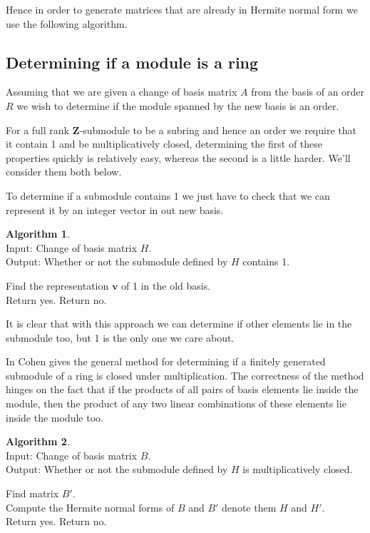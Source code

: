\documentclass[12pt,a4paper,abstracton,bibtotoc]{scrreprt}
\theoremstyle{definition}
\newtheorem{alg}{Algorithm}
\newcommand{\ZZ}{\mathbf{Z}}
\begin{document}
Hence in order to generate matrices that are already in Hermite normal form we use the following algorithm.

\subsection{Determining if a module is a ring}
Assuming that we are given a change of basis matrix $A$ from the basis of an order $R$ we wish to determine if the module spanned by the new basis is an order.

For a full rank $\ZZ$-submodule to be a subring and hence an order we require that it contain 1 and be multiplicatively closed, determining the first of these properties quickly is relatively easy, whereas the second is a little harder.
We'll consider them both below.

To determine if a submodule contains 1 we just have to check that we can represent it by an integer vector in out new basis.

\begin{alg}\label{alg:hasone}~\\ %
Input: Change of basis matrix $H$.\\
Output: Whether or not the submodule defined by $H$ contains 1.\\
\begin{algorithm}[H]
Find the representation $\mathbf v$ of 1 in the old basis.\\
{
Return yes.
}
{
Return no.
}
\end{algorithm}
\end{alg}

It is clear that with this approach we can determine if other elements lie in the submodule too, but 1 is the only one we care about.

In \cite{cohen93} Cohen gives the general method for determining if a finitely generated submodule of a ring is closed under multiplication.
The correctness of the method hinges on the fact that if the products of all pairs of basis elements lie inside the module, then the product of any two linear combinations of these elements lie inside the module too.

\begin{alg}
\label{alg:multclose}~\\
Input: Change of basis matrix $B$.\\
Output: Whether or not the submodule defined by $H$ is multiplicatively closed.\\
\begin{algorithm}[H]
Find matrix $B'$.\\
Compute the Hermite normal forms of $B$ and $B'$ denote them $H$ and $H'$.\\
{
Return yes.
}
{
Return no.
}
\end{algorithm}
\end{alg} 
\end{document}
